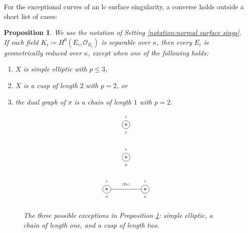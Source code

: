 \documentclass[12pt]{amsart}
\def\le{\leqslant}
\theoremstyle{plain}
\newtheorem{prop}[thm]{Proposition}
\theoremstyle{definition}
\theoremstyle{remark}
\newtheorem{defn and notation}[thm]{Definition and Notation}
\theoremstyle{plain}
\numberwithin{equation}{thm}
\begin{document}
For the exceptional curves of an lc surface singularity, a converse holds outside a short list of cases:

\begin{prop}\label{prop:equivalence of geom.red and separability}
    We use the notation of Setting \ref{notation:normal surface sings}.
    If each field $K_i \coloneqq H^0(E_i,\mathcal{O}_{E_i})$ is separable over $\kappa$, then every $E_i$ is geometrically reduced over $\kappa$, except when one of the following holds:
    \begin{enumerate}[label=\textup{(\alph*)}]
        \item $X$ is simple elliptic with $p \le 3$,
        \item $X$ is a cusp of length $2$ with $p=2$, or
        \item the dual graph of $\pi$ is a chain of length $1$ with $p=2$.
    \end{enumerate}
    \begin{figure}[h]
\centering
\begin{minipage}[b]{0.32\columnwidth}
    \centering
        \[
    \begin{tikzpicture}
        \node[draw, shape=circle, inner sep=1.8pt] (A1) at (0,0){$*$};
    \draw[shift={(0,0.4)}] (0,0) node{\tiny $1$};
    \draw[shift={(0,-0.4)}] (0,0) node{\tiny $1$};
    \end{tikzpicture}
    \]
\end{minipage}
\begin{minipage}[b]{0.32\columnwidth}
    \centering
        \[
    \begin{tikzpicture}
        \node[draw, shape=circle, inner sep=1.8pt] (A1) at (0,0){$*$};
    \draw[shift={(0,0.4)}] (0,0) node{\tiny $1$};
    \draw[shift={(0,-0.4)}] (0,0) node{\tiny $0$};
    \end{tikzpicture}
    \]
\end{minipage}
\begin{minipage}[b]{0.32\columnwidth}
    \centering
    \[
    \begin{tikzpicture}
    \node[draw, shape=circle, inner sep=1.8pt] (B1) at (0,0){$*$};
    \draw[shift={(0,0.4)}] (0,0) node{\tiny $r$};
    \draw[shift={(0,-0.4)}] (0,0) node{\tiny $0$};

    \node[draw, shape=circle, inner sep=1.8pt] (B2) at (2,0){$*$};
    \draw[shift={(0,0.4)}] (2,0) node{\tiny $r$};
    \draw[shift={(0,-0.4)}] (2,0) node{\tiny $0$};

    \draw[shift={(0,0.25)}] (1,0) node{\tiny $\langle 2r \rangle$};
    \draw (B1)--(B2);
    \end{tikzpicture}
    \]
\end{minipage}
\caption{The three possible exceptions in Proposition \ref{prop:equivalence of geom.red and separability}: simple elliptic, a chain of length one, and a cusp of length two.}
\end{figure}
    
\end{prop}
\end{document}
